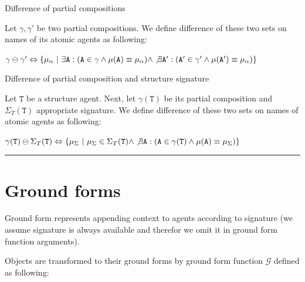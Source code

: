 \documentclass[12pt]{fithesis2}
\begin{document}
\begin{definition}{Difference of partial compositions}

Let $\gamma, \gamma'$ be two partial compositions. We define difference of these two sets on names of its atomic agents as following:

\begin{center}
$\gamma \ominus \gamma' \Leftrightarrow \{ \mu_\alpha ~|~ \exists \mathtt{A}: (\mathtt{A} \in \gamma \wedge \mu(\mathtt{A}) \equiv \mu_\alpha ) \wedge \not\exists \mathtt{A}': (\mathtt{A}' \in \gamma' \wedge \mu(\mathtt{A}') \equiv \mu_\alpha)\}$
\end{center}
\end{definition}

\begin{definition}{Difference of partial composition and structure signature}

Let $\mathtt{T}$ be a structure agent. Next, let $\gamma(\mathtt{T})$ be its partial composition and $\Sigma_T(\mathtt{T})$ appropriate signature. We define difference of these two sets on names of atomic agents as following:

\begin{center}
$\gamma(\mathtt{T}) \ominus \Sigma_T(\mathtt{T}) \Leftrightarrow \{ \mu_\Sigma ~|~ \mu_\Sigma \in \Sigma_T(\mathtt{T}) \wedge \not\exists \mathtt{A}: (\mathtt{A} \in \gamma(\mathtt{T}) \wedge \mu(\mathtt{A}) \equiv \mu_\Sigma)\}$
\end{center}
\end{definition}

\noindent\rule{\textwidth}{2pt}

\section{Ground forms}

Ground form represents appending context to agents according to signature (we assume signature is always available and therefor we omit it in ground form function arguments).

Objects are transformed to their ground forms by ground form function $\mathcal{G}$ defined as following:
\end{document}

